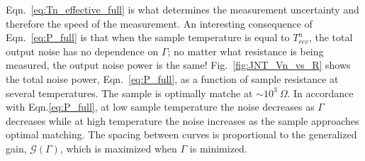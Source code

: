 Eqn.~\ref{eq:Tn_effective_full} is what determines the measurement uncertainty and therefore the speed of the measurement. An interesting consequence of Eqn.~\ref{eq:P_full} is that when the sample temperature is equal to $T_{rev}^n$, the total output noise has no dependence on $\Gamma$; no matter what resistance is being measured, the output noise power is the same! Fig.~\ref{fig:JNT_Vn_vs_R} shows the total noise power, Eqn.~\ref{eq:P_full}, as a function of sample resistance at several temperatures. The sample is optimally matche at ${\sim}10^3~\Omega$. In accordance with Eqn.\ref{eq:P_full}, at low sample temperature the noise decreases as $\Gamma$ decreases while at high temperature the noise increases as the sample approaches optimal matching. The spacing between curves is proportional to the generalized gain, $\mathcal{G}(\Gamma)$, which is maximized when $\Gamma$ is minimized.

